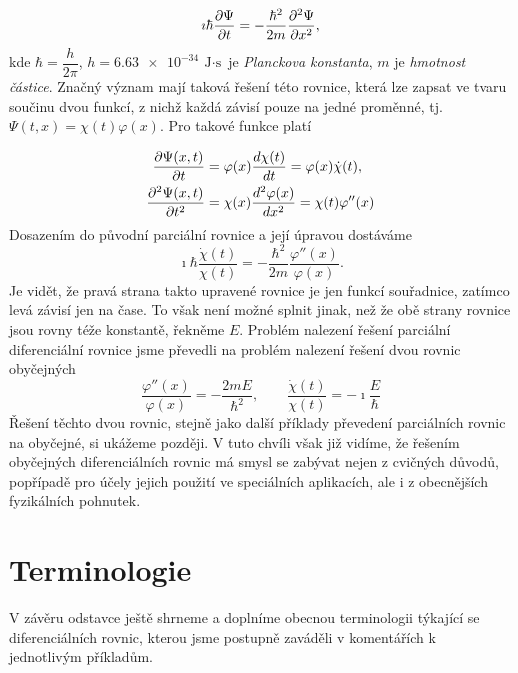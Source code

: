       \begin{equation*}
        \imath\hbar\dfrac{\partial \Psi}{\partial t} = -\dfrac{\hbar^2}{2m}\dfrac{\partial^2 \Psi}{\partial x^2},
      \end{equation*}
      kde \(\hbar = \dfrac{h}{2\pi}\), \(h = \SI{6.63e-34}{\J\cdot\s}\) je \emph{Planckova 
      konstanta}, \(m\) je \emph{hmotnost částice}. Značný význam mají taková řešení této rovnice, 
      která lze zapsat ve tvaru součinu dvou funkcí, z nichž každá závisí pouze na jedné proměnné, 
      tj. \(\Psi(t,x) = \chi(t)\varphi(x)\). Pro 
      takové funkce platí
      
      \begin{align*}
        \dfrac{\partial \Psi(x,t)}{\partial t}  &= \varphi(x)\dfrac{d \chi(t)}{d t} = \varphi(x)\dot{\chi}(t), \\
        \dfrac{\partial^2 \Psi(x,t)}{\partial t^2} &= \chi(x)\dfrac{d^2 \varphi(x)}{d x^2} = \chi(t)\varphi''(x)
      \end{align*}
      Dosazením do původní parciální rovnice a její úpravou dostáváme
      \begin{equation*}
        \imath\hbar\dfrac{\dot{\chi}(t)}{\chi(t)} = 
            -\dfrac{\hbar^2}{2m}\dfrac{\varphi''(x)}{\varphi(x)}.
      \end{equation*}
      Je vidět, že pravá strana takto upravené rovnice je jen funkcí souřadnice, zatímco levá závisí
      jen na čase. To však není možné splnit jinak, než že obě strany rovnice jsou rovny téže
      konstantě, řekněme \(E\). Problém nalezení řešení parciální diferenciální rovnice jsme
      převedli na problém nalezení řešení dvou rovnic obyčejných
      \begin{equation*}
        \dfrac{\varphi''(x)}{\varphi(x)} = -\dfrac{2mE}{\hbar^2}, \qquad
        \dfrac{\dot{\chi}(t)}{\chi(t)} = -\imath\dfrac{E}{\hbar}
      \end{equation*}
      Řešení těchto dvou rovnic, stejně jako další příklady převedení parciálních rovnic na
      obyčejné, si ukážeme později. V tuto chvíli však již vidíme, že řešením obyčejných
      diferenciálních rovnic má smysl se zabývat nejen z cvičných důvodů, popřípadě pro účely jejich
      použití ve speciálních aplikacích, ale i z obecnějších fyzikálních pohnutek. 
      \cite[s.~229]{Musilova2012MA2}
    
\section{Terminologie}\label{mai:IIchapIVsecII}
  V závěru odstavce ještě shrneme a doplníme obecnou terminologii týkající se diferenciálních
  rovnic, kterou jsme postupně zaváděli v komentářích k jednotlivým příkladům. 
  
